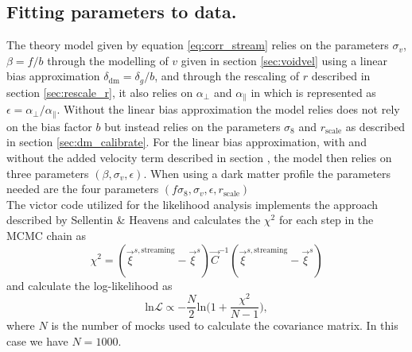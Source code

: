 \subsection{Fitting parameters to data.}
The theory model given by equation \ref{eq:corr_stream} relies on the parameters $\sigma_v$, $\beta=f/b$ through the modelling of $v$ given in section \ref{sec:voidvel} using a linear bias approximation $\delta_\mathrm{dm}=\delta_g/b$, and through the rescaling of $r$ described in section \ref{sec:rescale_r}, it also relies on $\alpha_\perp$ and $\alpha_\parallel$ in which is represented as $\epsilon=\alpha_\perp/\alpha_\parallel$.
Without the linear bias approximation the model relies does not rely on the bias factor $b$ but instead relies on the parameters $\sigma_8$ and $r_\mathrm{scale}$ as described in section \ref{sec:dm_calibrate}. For the linear bias approximation, with and without the added velocity term described in section , the model then relies on three parameters $(\beta,\sigma_v,\epsilon)$. When using a dark matter profile the parameters needed are the four parameters $(f\sigma_8, \sigma_v, \epsilon, r_\mathrm{scale})$
\\\indent
The victor code utilized for the likelihood analysis implements the approach described by Sellentin \& Heavens \cite{heavens2010statistical} and calculates the $\chi^2$ for each step in the MCMC chain as
\begin{equation}
    \chi^2=(\vec{\xi}^{s,\mathrm{streaming}}-\vec{\xi}^{s})\vec{C}^{-1}(\vec{\xi}^{s,\mathrm{streaming}}-\vec{\xi}^{s})
\end{equation}
and calculate the log-likelihood as
\begin{equation}
    \mathrm{ln}\mathcal{L}\propto-\frac{N}{2}\mathrm{ln}\big(1+\frac{\chi^2}{N-1}\big),
\end{equation}
where $N$ is the number of mocks used to calculate the covariance matrix. In this case we have $N=1000$.